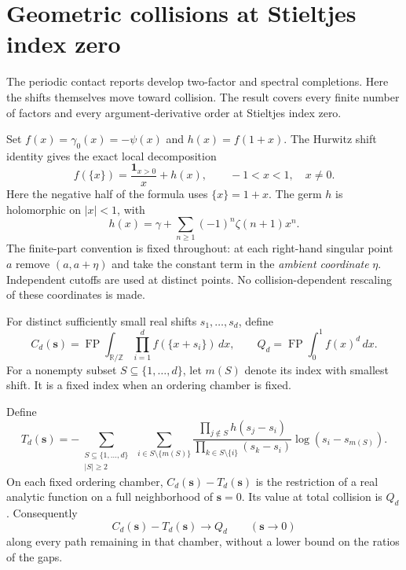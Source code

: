 \section{Geometric collisions at Stieltjes index zero}
\label{gc:section}

The periodic contact reports \cite{RepoPeriodic,RepoContact,RepoMixed} develop
two-factor and spectral completions. Here the shifts themselves move toward
collision. The result covers every finite number of factors and every
argument-derivative order at Stieltjes index zero.

Set $f(x)=\gamma_0(x)=-\psi(x)$ and $h(x)=f(1+x)$.  The Hurwitz shift
identity gives the exact local decomposition
\begin{equation}\label{gc:one-sided}
 f(\{x\})=\frac{\boldsymbol{1}_{x>0}}x+h(x),\qquad -1<x<1,
 \quad x\ne0.
\end{equation}
Here the negative half of the formula uses $\{x\}=1+x$.  The germ $h$ is
holomorphic on $|x|<1$, with
\begin{equation}\label{gc:hseries}
 h(x)=\gamma+\sum_{n\ge1}(-1)^n\zeta(n+1)x^n.
\end{equation}
The finite-part convention is fixed throughout: at each right-hand
singular point $a$ remove $(a,a+\eta)$ and take the constant term in the
\emph{ambient coordinate} $\eta$.  Independent cutoffs are used at distinct
points.  No collision-dependent rescaling of these coordinates is made.

For distinct sufficiently small real shifts $s_1,\ldots,s_d$, define
\begin{equation}\label{gc:Cdef}
 C_d(\boldsymbol{s})=
 \operatorname{FP}\int_{\mathbb R/\mathbb Z}
       \prod_{i=1}^d f(\{x+s_i\})\,dx,
 \qquad
 Q_d=\operatorname{FP}\int_0^1 f(x)^d\,dx.
\end{equation}
For a nonempty subset $S\subseteq\{1,\ldots,d\}$, let $m(S)$ denote its
index with smallest shift.  It is a fixed index when an ordering chamber
is fixed.

\begin{theorem}
\label{gc:main}
Define
\begin{equation}\label{gc:T}
 T_d(\boldsymbol{s})=
 -\sum_{\substack{S\subseteq\{1,\ldots,d\}\\ |S|\ge2}}
  \ \sum_{i\in S\setminus\{m(S)\}}
  \frac{\displaystyle\prod_{j\notin S}h(s_j-s_i)}
       {\displaystyle\prod_{k\in S\setminus\{i\}}(s_k-s_i)}
       \log(s_i-s_{m(S)}).
\end{equation}
On each fixed ordering chamber,
$C_d(\boldsymbol{s})-T_d(\boldsymbol{s})$ is the restriction of a real
analytic function on a full neighborhood of $\boldsymbol{s}=0$.  Its value
at total collision is $Q_d$.  Consequently
\begin{equation}\label{gc:anypath}
 C_d(\boldsymbol{s})-T_d(\boldsymbol{s})\longrightarrow Q_d
 \qquad (\boldsymbol{s}\longrightarrow0)
\end{equation}
along every path remaining in that chamber, without a lower bound on the
ratios of the gaps.
\end{theorem}

